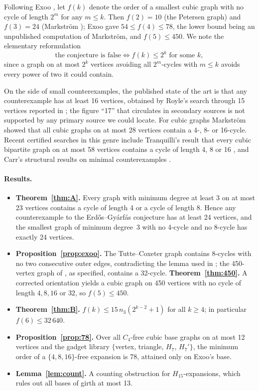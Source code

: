 \documentclass[11pt]{article}
\theoremstyle{remark}
\theoremstyle{definition}
\begin{document}
Following Exoo \cite{Exoo}, let $f(k)$ denote the order of a smallest cubic graph with no cycle of length $2^m$ for any $m\le k$. Then $f(2)=10$ (the Petersen graph) and $f(3)=24$ (Markstr\"om \cite{Markstrom}); Exoo gave $54\le f(4)\le 78$, the lower bound being an unpublished computation of Markstr\"om, and $f(5)\le 450$. We note the elementary reformulation
\begin{equation}\label{eq:reform}
\text{the conjecture is false} \iff f(k)\le 2^k \text{ for some } k,
\end{equation}
since a graph on at most $2^k$ vertices avoiding all $2^m$-cycles with $m\le k$ avoids every power of two it could contain.

On the side of small counterexamples, the published state of the art is that any counterexample has at least 16 vertices, obtained by Royle's search through 15 vertices reported in \cite{Markstrom}; the figure ``17'' that circulates in secondary sources is not supported by any primary source we could locate. For cubic graphs Markstr\"om showed that all cubic graphs on at most 28 vertices contain a 4-, 8- or 16-cycle. Recent certified searches in this genre include Tranquilli's result that every cubic bipartite graph on at most 58 vertices contains a cycle of length 4, 8 or 16 \cite{Tranquilli}, and Carr's structural results on minimal counterexamples \cite{Carr}.

\paragraph{Results.}
\begin{itemize}
\item \textbf{Theorem~\ref{thm:A}.} Every graph with minimum degree at least 3 on at most 23 vertices contains a cycle of length 4 or a cycle of length 8. Hence any counterexample to the Erd\H{o}s--Gy\'arf\'as conjecture has at least 24 vertices, and the smallest graph of minimum degree~3 with no 4-cycle and no 8-cycle has exactly 24 vertices.
\item \textbf{Proposition~\ref{prop:exoo}.} The Tutte--Coxeter graph contains 8-cycles with no two consecutive outer edges, contradicting the lemma used in \cite{Exoo}; the 450-vertex graph of \cite{Exoo}, as specified, contains a 32-cycle. \textbf{Theorem~\ref{thm:450}.} A corrected orientation yields a cubic graph on 450 vertices with no cycle of length $4,8,16$ or $32$, so $f(5)\le 450$.
\item \textbf{Theorem~\ref{thm:B}.} $f(k)\le 15\,n_3(2^{k-2}+1)$ for all $k\ge 4$; in particular $f(6)\le 32\,640$.
\item \textbf{Proposition~\ref{prop:78}.} Over all $C_4$-free cubic base graphs on at most 12 vertices and the gadget library $\{$vertex, triangle, $H_7$, $H_7'\}$, the minimum order of a $\{4,8,16\}$-free expansion is 78, attained only on Exoo's base.
\item \textbf{Lemma~\ref{lem:count}.} A counting obstruction for $H_{15}$-expansions, which rules out all bases of girth at most 13.
\end{itemize}
\end{document}
